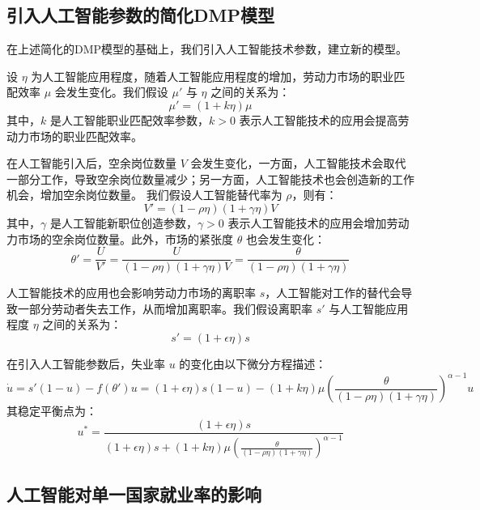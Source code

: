 \documentclass{article}
\begin{document}
\subsection{引入人工智能参数的简化DMP模型}

在上述简化的DMP模型的基础上，我们引入人工智能技术参数，建立新的模型。

设 $\eta$ 为人工智能应用程度，随着人工智能应用程度的增加，劳动力市场的职业匹配效率 $\mu$ 会发生变化。我们假设 $\mu'$ 与 $\eta$ 之间的关系为：
\begin{equation}
    \mu' = (1 + k\eta)\mu
\end{equation}
其中，$k$ 是人工智能职业匹配效率参数，$k > 0$ 表示人工智能技术的应用会提高劳动力市场的职业匹配效率。

在人工智能引入后，空余岗位数量 $V$ 会发生变化，一方面，人工智能技术会取代一部分工作，导致空余岗位数量减少；另一方面，人工智能技术也会创造新的工作机会，增加空余岗位数量。
我们假设人工智能替代率为 $\rho$，则有：
\begin{equation}
    V' = (1 - \rho\eta)(1 + \gamma\eta) V
\end{equation}
其中，$\gamma$ 是人工智能新职位创造参数，$\gamma > 0$ 表示人工智能技术的应用会增加劳动力市场的空余岗位数量。此外，市场的紧张度 $\theta$ 也会发生变化：
\begin{equation}
    \theta' = \frac{U}{V'} = \frac{U}{(1 - \rho\eta)(1 + \gamma\eta) V} = \frac{\theta}{(1 - \rho\eta)(1 + \gamma\eta)}
\end{equation}

人工智能技术的应用也会影响劳动力市场的离职率 $s$，人工智能对工作的替代会导致一部分劳动者失去工作，从而增加离职率。我们假设离职率 $s'$ 与人工智能应用程度 $\eta$ 之间的关系为：
\begin{equation}
    s' = (1 + \epsilon\eta)s
\end{equation}

在引入人工智能参数后，失业率 $u$ 的变化由以下微分方程描述：
\begin{equation}
    \dot{u} = s'(1 - u) - f(\theta') u = (1 + \epsilon\eta)s(1 - u) - (1 + k\eta)\mu \left(\frac{\theta}{(1 - \rho\eta)(1 + \gamma\eta)}\right)^{\alpha-1} u 
\end{equation}
其稳定平衡点为：
\begin{equation}
    u^* = \frac{(1 + \epsilon\eta)s}{(1 + \epsilon\eta)s + (1 + k\eta)\mu \left(\frac{\theta}{(1 - \rho\eta)(1 + \gamma\eta)}\right)^{\alpha-1}}
\end{equation}

\subsection{人工智能对单一国家就业率的影响}
\end{document}
